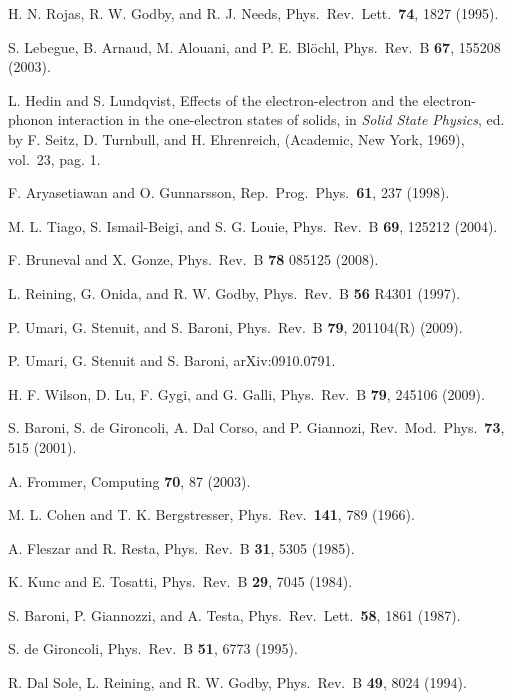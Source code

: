 \documentclass[twocolumn,prb,showpacs,superscriptaddress]{revtex4}
\begin{document}
\begin{thebibliography}{99}
H. N. Rojas, R. W. Godby, and R. J. Needs,
Phys.\ Rev.\ Lett.\ {\bf 74}, 1827 (1995).

S. Lebegue, B. Arnaud, M. Alouani, and P. E. Bl\"ochl,
Phys.\ Rev.\ B {\bf 67}, 155208 (2003). 

L. Hedin and S. Lundqvist,
Effects of the electron-electron and the electron-phonon interaction in
the one-electron states of solids,
in {\it Solid State Physics}, ed. by F. Seitz, D. Turnbull, and
H. Ehrenreich, (Academic, New York, 1969), vol.\ 23, pag. 1.

F. Aryasetiawan and O. Gunnarsson,
Rep.\ Prog.\ Phys.\ {\bf 61}, 237 (1998). 

M. L. Tiago, S. Ismail-Beigi, and S. G. Louie,
Phys.\ Rev.\ B {\bf 69}, 125212 (2004).

F. Bruneval and X. Gonze,
Phys.\ Rev.\ B {\bf 78} 085125 (2008).

L. Reining, G. Onida, and R. W. Godby, 
Phys.\ Rev.\ B {\bf 56} R4301 (1997).

P. Umari, G. Stenuit, and S. Baroni,
Phys.\ Rev.\ B {\bf 79}, 201104(R) (2009).

P. Umari, G. Stenuit and S. Baroni,
arXiv:0910.0791.

H. F. Wilson, D. Lu, F. Gygi, and G. Galli,
Phys.\ Rev.\ B {\bf 79}, 245106 (2009).

S. Baroni, S. de Gironcoli, A. Dal Corso, and P. Giannozi, 
Rev.\ Mod.\ Phys.\ {\bf 73}, 515 (2001).

A. Frommer,
Computing {\bf 70}, 87 (2003).

M. L. Cohen and T. K. Bergstresser,
Phys.\ Rev.\ {\bf 141}, 789 (1966).

A. Fleszar and R. Resta,
Phys.\ Rev.\ B {\bf 31}, 5305 (1985).

K. Kunc and E. Tosatti,
Phys.\ Rev.\ B {\bf 29}, 7045 (1984).

S. Baroni, P. Giannozzi, and A. Testa,
Phys.\ Rev.\ Lett.\ {\bf 58}, 1861 (1987).

S. de Gironcoli,
Phys.\ Rev.\ B {\bf 51}, 6773 (1995).

R. Dal Sole, L. Reining, and R. W. Godby,
Phys.\ Rev.\ B {\bf 49}, 8024 (1994).


\end{thebibliography}
\end{document}

